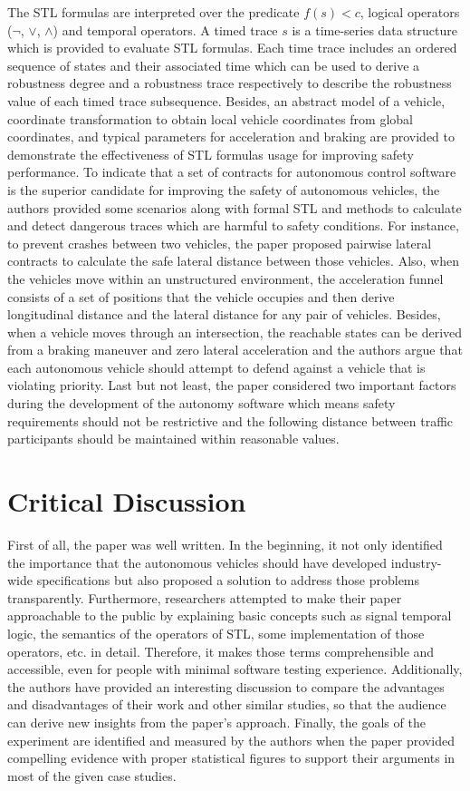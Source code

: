 \documentclass[10pt,a4paper]{report}
\begin{document}
The STL formulas are interpreted over the predicate $f(s) < c$, logical operators ($\neg$, $\lor$, $\land$) and temporal operators.
%
A timed trace $s$ is a time-series data structure which is provided to evaluate STL formulas.
%
Each time trace includes an ordered sequence of states and their associated time which can be used to derive a robustness degree and a robustness trace respectively to describe the robustness value of each timed trace subsequence.
%
Besides, an abstract model of a vehicle, coordinate transformation to obtain local vehicle coordinates from global coordinates, and typical parameters for acceleration and braking are provided to demonstrate the effectiveness of STL formulas usage for improving safety performance.
%
To indicate that a set of contracts for autonomous control software is the superior candidate for improving the safety of autonomous vehicles, the authors provided some scenarios along with formal STL and methods to calculate and detect dangerous traces which are harmful to safety conditions.
%
For instance, to prevent crashes between two vehicles, the paper proposed pairwise lateral contracts to calculate the safe lateral distance between those vehicles.
%
Also, when the vehicles move within an unstructured environment, the acceleration funnel consists of a set of positions that the vehicle occupies and then derive longitudinal distance and the lateral distance for any pair of vehicles.
%
Besides, when a vehicle moves through an intersection, the reachable states can be derived from a braking maneuver and zero lateral acceleration and the authors argue that each autonomous vehicle should attempt to defend against a vehicle that is violating priority.
%
Last but not least, the paper considered two important factors during the development of the autonomy software which means safety requirements should not be restrictive and the following distance between traffic participants should be maintained within reasonable values.

\section{Critical Discussion}
First of all, the paper was well written. In the beginning, it not only identified the importance that the autonomous vehicles should have developed industry-wide speciﬁcations but also proposed a solution to address those problems transparently.
%
Furthermore, researchers attempted to make their paper approachable to the public by explaining basic concepts such as signal temporal logic, the semantics of the operators of STL, some implementation of those operators, etc. in detail. 
%
Therefore, it makes those terms comprehensible and accessible, even for people with minimal software testing experience.
%
Additionally, the authors have provided an interesting discussion to compare the advantages and disadvantages of their work and other similar studies, so that the audience can derive new insights from the paper's approach.
%
Finally, the goals of the experiment are identified and measured by the authors when the paper provided compelling evidence with proper statistical figures to support their arguments in most of the given case studies.
%
\end{document}
